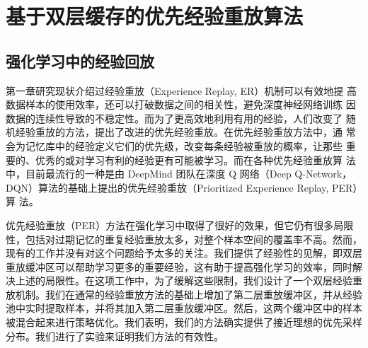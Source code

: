 
\chapter{基于双层缓存的优先经验重放算法}

\section{强化学习中的经验回放}

第一章研究现状介绍过经验重放（Experience Replay, ER）机制可以有效地提
高数据样本的使用效率，还可以打破数据之间的相关性，避免深度神经网络训练 因数据的连续性导致的不稳定性。而为了更高效地利用有用的经验，人们改变了 随机经验重放的方法，提出了改进的优先经验重放。在优先经验重放方法中，通 常会为记忆库中的经验定义它们的优先级，改变每条经验被重放的概率，让那些 重要的、优秀的或对学习有利的经验更有可能被学习。而在各种优先经验重放算 法中，目前最流行的一种是由 DeepMind 团队在深度 Q 网络（Deep Q-Network， DQN）算法的基础上提出的优先经验重放（Prioritized Experience Replay, PER）算 法。


优先经验重放（PER）方法在强化学习中取得了很好的效果，但它仍有很多局限性，包括对过期记忆的重复经验重放太多，对整个样本空间的覆盖率不高。然而，现有的工作并没有对这个问题给予太多的关注。我们提供了经验性的见解，即双层重放缓冲区可以帮助学习更多的重要经验，这有助于提高强化学习的效率，同时解决上述的局限性。在这项工作中，为了缓解这些限制，我们设计了一个双层经验重放机制。我们在通常的经验重放方法的基础上增加了第二层重放缓冲区，并从经验池中实时提取样本，并将其加入第二层重放缓冲区。然后，这两个缓冲区中的样本被混合起来进行策略优化。我们表明，我们的方法确实提供了接近理想的优先采样分布。我们进行了实验来证明我们方法的有效性。

